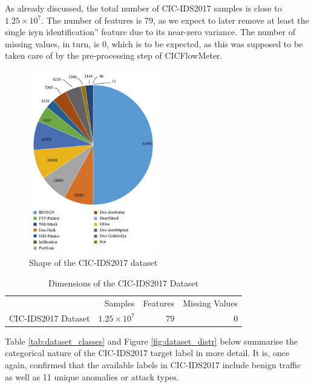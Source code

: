 As already discussed, the total number of CIC-IDS2017 samples is close to $1.25\times10^7$. The number of features is 79, as we expect to later remove at least the single isyn identification'' feature due to its near-zero variance. The number of missing values, in turn, is 0, which is to be expected, as this was supposed to be taken care of by the pre-processing step of CICFlowMeter.

\begin{figure}[H] 
\centering 
\includegraphics[width=0.5\textwidth]{assets/figures/dataset_shape.jpg} 
\caption{Shape of the CIC-IDS2017 dataset} 
\label{fig:dataset_shape} 
\end{figure} 
\parencite{articl5432e}

\begin{table}[H] 
\centering 
\caption{Dimensions of the CIC-IDS2017 Dataset} 
\label{tab:dataset_shape} 
\begin{tabular}{lrrr} 
\toprule 
{} & Samples & Features & Missing Values \\ 
CIC-IDS2017 Dataset & $1.25\times10^7$ & 79 & 0 \\ 
\bottomrule 
\end{tabular} 
\end{table} 

Table \ref{tab:dataset_classes} and Figure \ref{fig:dataset_distr} below summarise the categorical nature of the CIC-IDS2017 target label in more detail. It is, once again, confirmed that the available labels in CIC-IDS2017 include benign traffic as well as 11 unique anomalies or attack types.

